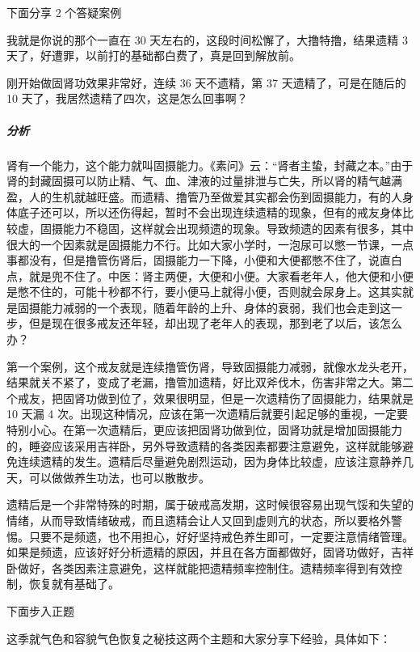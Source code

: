 下面分享 2 个答疑案例

\begin{case}
    我就是你说的那个一直在 30 天左右的，这段时间松懈了，大撸特撸，结果遗精 3 天了，好遭罪，以前打的基础都白费了，真是回到解放前。
\end{case}

\begin{case}
    刚开始做固肾功效果非常好，连续 36 天不遗精，第 37 天遗精了，可是在随后的 10 天了，我居然遗精了四次，这是怎么回事啊？

    \subparagraph{分析} 肾有一个能力，这个能力就叫固摄能力。《素问》云：“肾者主蛰，封藏之本。”由于肾的封藏固摄可以防止精、气、血、津液的过量排泄与亡失，所以肾的精气越满盈，人的生机就越旺盛。而遗精、撸管乃至做爱其实都会伤到固摄能力，有的人身体底子还可以，所以还伤得起，暂时不会出现连续遗精的现象，但有的戒友身体比较虚，固摄能力不稳固，这样就会出现频遗的现象。导致频遗的因素有很多，其中很大的一个因素就是固摄能力不行。比如大家小学时，一泡尿可以憋一节课，一点事都没有，但是撸管伤肾后，固摄能力一下降，小便和大便都憋不住了，说直白点，就是兜不住了。中医：肾主两便，大便和小便。大家看老年人，他大便和小便是憋不住的，可能十秒都不行，要小便马上就得小便，否则就会尿身上。这其实就是固摄能力减弱的一个表现，随着年龄的上升、身体的衰弱，我们也会走到这一步，但是现在很多戒友还年轻，却出现了老年人的表现，那到老了以后，该怎么办？

    第一个案例，这个戒友就是连续撸管伤肾，导致固摄能力减弱，就像水龙头老开，结果就关不紧了，变成了老漏，撸管加遗精，好比双斧伐木，伤害非常之大。第二个戒友，把固肾功做到位了，效果很明显，但是一次遗精伤了固摄能力，结果就是 10 天漏 4 次。出现这种情况，应该在第一次遗精后就要引起足够的重视，一定要特别小心。在第一次遗精后，更应该把固肾功做到位，固肾功就是增加固摄能力的，睡姿应该采用吉祥卧，另外导致遗精的各类因素都要注意避免，这样就能够避免连续遗精的发生。遗精后尽量避免剧烈运动，因为身体比较虚，应该注意静养几天，可以做做养生功法，也可以散散步。

    遗精后是一个非常特殊的时期，属于破戒高发期，这时候很容易出现气馁和失望的情绪，从而导致情绪破戒，而且遗精会让人又回到虚则亢的状态，所以要格外警惕。只要不是频遗，也不用担心，好好坚持戒色养生即可，一定要注意情绪管理。如果是频遗，应该好好分析遗精的原因，并且在各方面都做好，固肾功做好，吉祥卧做好，各类因素注意避免，这样就能把遗精频率控制住。遗精频率得到有效控制，恢复就有基础了。
\end{case}

下面步入正题

这季就气色和容貌气色恢复之秘技这两个主题和大家分享下经验，具体如下：

